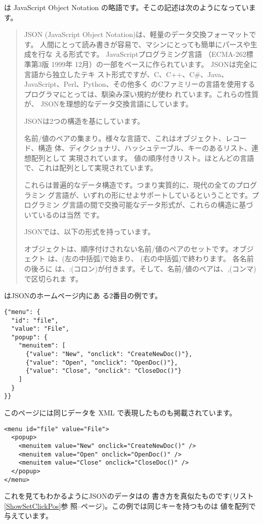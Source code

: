 は JavaScript
Object Notation の略語です。そこの記述は次のようになっています。
\begin{quotation}
 JSON (JavaScript Object Notation)は、軽量のデータ交換フォーマットです。
 人間にとって読み書きが容易で、マシンにとっても簡単にパースや生成を行な
 える形式です。 JavaScriptプログラミング言語 （ECMA-262標準第3版 1999年
 12月）の一部をベースに作られています。 JSONは完全に言語から独立したテキ
 スト形式ですが、C、C++、C\#、Java、JavaScript、Perl、Python、その他多く
 のCファミリーの言語を使用するプログラマにとっては、馴染み深い規約が使わ
 れています。これらの性質が、 JSONを理想的なデータ交換言語にしています。 

JSONは2つの構造を基にしています。

名前/値のペアの集まり。様々な言語で、これはオブジェクト、レコード、構造
 体、ディクショナリ、ハッシュテーブル、キーのあるリスト、連想配列として
 実現されています。
値の順序付きリスト。ほとんどの言語で、これは配列として実現されています。
 　

これらは普遍的なデータ構造です。つまり実質的に、現代の全てのプログラミン
 グ言語が、いずれの形にせよサポートしているということです。プログラミン
 グ言語の間で交換可能なデータ形式が、これらの構造に基づいているのは当然
 です。

JSONでは、以下の形式を持っています。

オブジェクトは、順序付けされない名前/値のペアのセットです。オブジェクト
は、{(左の中括弧)で始まり、} (右の中括弧)で終わります。 各名前の後ろに
は、:(コロン)が付きます。そして、名前/値のペアは、,(コンマ)で区切られま
す。
\end{quotation}
はJSONのホームページ内にあ
る2番目の例です。
\begin{verbatim}
{"menu": {
  "id": "file",
  "value": "File",
  "popup": {
    "menuitem": [
      {"value": "New", "onclick": "CreateNewDoc()"},
      {"value": "Open", "onclick": "OpenDoc()"},
      {"value": "Close", "onclick": "CloseDoc()"}
    ]
  }
}}
\end{verbatim}
このページには同じデータを XML で表現したものも掲載されています。
\begin{verbatim}
<menu id="file" value="File">
  <popup>
    <menuitem value="New" onclick="CreateNewDoc()" />
    <menuitem value="Open" onclick="OpenDoc()" />
    <menuitem value="Close" onclick="CloseDoc()" />
  </popup>
</menu>
\end{verbatim}
これを見てもわかるようにJSONのデータは\JS の
書き方を真似たものです(リスト\ref{ShowSetClickPos}参
照--\pageref{ShowSetClickPos}ページ)。この例では同じキーを持つものは
値を配列で与えています。


